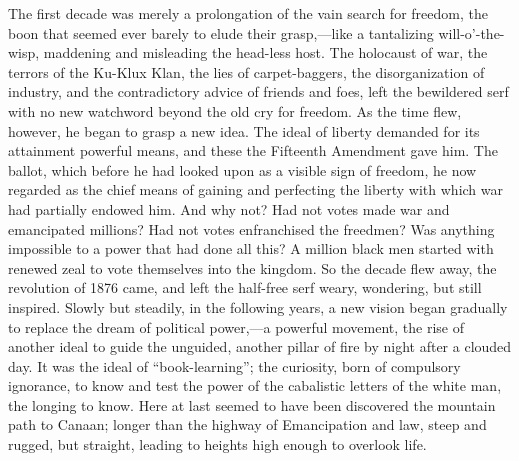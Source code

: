 The first decade was merely a prolongation of the vain search for
freedom, the boon that seemed ever barely to elude their grasp,---like
a tantalizing will-o'-the-wisp, maddening and misleading the
head-less host. The holocaust of war, the terrors of the
Ku-Klux Klan, the lies of carpet-baggers, the disorganization of
industry, and the contradictory advice of friends and foes, left the
bewildered serf with no new watchword beyond the old cry for freedom.
As the time flew, however, he began to grasp a new idea. The ideal of
liberty demanded for its attainment powerful means, and these the
Fifteenth Amendment gave him. The ballot, which before he had looked
upon as a visible sign of freedom, he now regarded as the chief means
of gaining and perfecting the liberty with which war had partially
endowed him. And why not? Had not votes made war and emancipated
millions? Had not votes enfranchised the freedmen? Was anything
impossible to a power that had done all this? A million black men
started with renewed zeal to vote themselves into the kingdom. So the
decade flew away, the revolution of 1876 came, and left the half-free
serf weary, wondering, but still inspired. Slowly but steadily, in the
following years, a new vision began gradually to replace the dream of
political power,---a powerful movement, the rise of another ideal to
guide the unguided, another pillar of fire by night after a clouded
day. It was the ideal of ``book-learning''; the curiosity, born of
compulsory ignorance, to know and test the power of the cabalistic
letters of the white man, the longing to know. Here at last seemed to
have been discovered the mountain path to Canaan; longer than the
highway of Emancipation and law, steep and rugged, but straight,
leading to heights high enough to overlook life.

